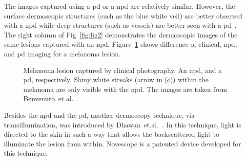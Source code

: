 The images captured using a \ac{pd} or a \ac{npd} are relatively similar.
However, the surface dermoscopic structures (such as the blue white veil) are better observed with a \ac{npd} while deep structures (such as vessels) are better seen with a \ac{pd}~\cite{wang2010noninvasive, benvenuto2007differences}.
The right column of Fig~\ref{fig:fig2} demonstrates the dermoscopic images of the same lesions captured with an \ac{npd}.
Figure~\ref{fig:fig3} shows difference of clinical, \ac{npd}, and \ac{pd} imaging for a melanoma lesion.

\begin{figure}\centering
{}
	\caption[Clinical, \ac{npd} and \ac{pd} images of melanoma]{Melanoma lesion captured by clinical photography,  An \ac{npd}, and a \ac{pd}, respectively. Shiny white streaks (arrow in (c)) within the melanoma are only visible with the \ac{npd}. The images are taken from Benvenuto~et al.~\cite{benvenuto2007differences}}
\label{fig:fig3}
\end{figure}


Besides the \ac{npd} and the \ac{pd}, another dermoscopy technique, via transillumination, was introduced by Dhawan~et.al.~\cite{Dhawan1985,Dhawan1984}.
In this technique, light is directed to the skin in such a way that allows the backscattered light to illuminate the lesion from within. 
Novescope is a patented device developed for this technique. 
 


